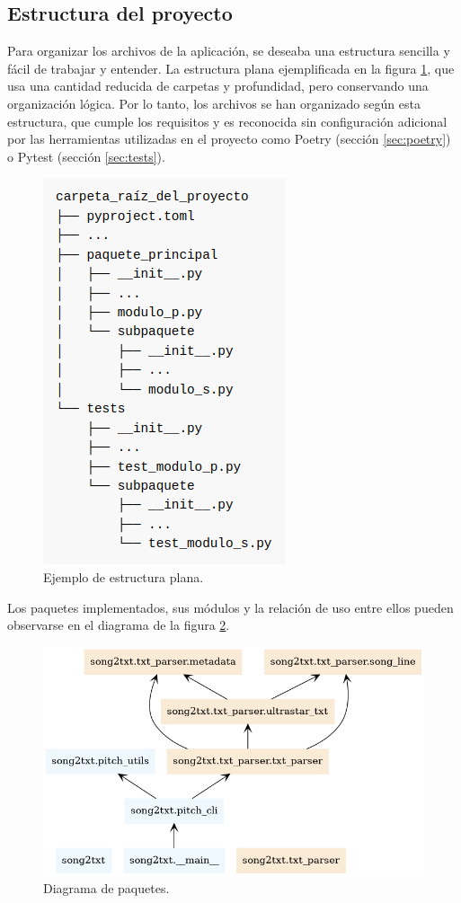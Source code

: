 \subsection{Estructura del proyecto}
Para organizar los archivos de la aplicación, se deseaba una estructura sencilla y fácil de trabajar y  entender.  La estructura plana ejemplificada en la figura \ref{fig:layout1}, que usa una cantidad reducida de carpetas y profundidad, pero conservando una organización lógica.  Por lo tanto, los archivos se han organizado según esta estructura, que cumple los requisitos y es reconocida sin configuración adicional por las herramientas utilizadas en el proyecto como Poetry (sección \ref{sec:poetry}) o Pytest (sección \ref{sec:tests}).

\begin{figure}[h]
	\centering
	\includegraphics[width=0.5\linewidth]{logos/layout.png}
	\caption{Ejemplo de estructura plana.}
	\label{fig:layout1}
\end{figure}


Los paquetes implementados, sus módulos y la relación de uso entre ellos pueden observarse en el diagrama de la figura \ref{fig:modules1}.


\begin{figure}[h!]
	\includegraphics[width=\linewidth]{logos/packages.png}
	\caption{Diagrama de paquetes.}
	\label{fig:modules1}
\end{figure}


